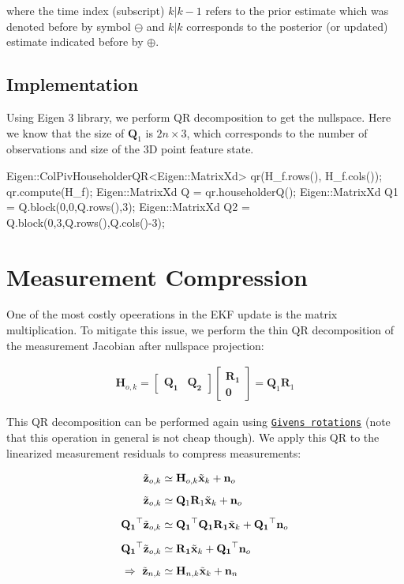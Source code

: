 where the time index (subscript) $k|k-1$ refers to the prior estimate which was denoted before by symbol $\ominus$ and $k|k$ corresponds to the posterior (or updated) estimate indicated before by $\oplus$.\hypertarget{update-null_implementation}{}\subsection{Implementation}\label{update-null_implementation}
Using Eigen 3 library, we perform QR decomposition to get the nullspace. Here we know that the size of $\mathbf{Q}_1$ is $2n\times3$, which corresponds to the number of observations and size of the 3D point feature state.


\begin{DoxyCode}
Eigen::ColPivHouseholderQR<Eigen::MatrixXd> qr(H\_f.rows(), H\_f.cols());
qr.compute(H\_f);
Eigen::MatrixXd Q = qr.householderQ();
Eigen::MatrixXd Q1 = Q.block(0,0,Q.rows(),3);
Eigen::MatrixXd Q2 = Q.block(0,3,Q.rows(),Q.cols()-3);
\end{DoxyCode}
 \hypertarget{update-compress}{}\section{Measurement Compression}\label{update-compress}
One of the most costly opeerations in the E\+KF update is the matrix multiplication. To mitigate this issue, we perform the thin QR decomposition of the measurement Jacobian after nullspace projection\+:

\begin{align*} \mathbf{H}_{o,k} = \begin{bmatrix} \mathbf{Q_1} & \mathbf{Q_2} \end{bmatrix} \begin{bmatrix} \mathbf{R_1} \\ \mathbf{0} \end{bmatrix} = \mathbf Q_1 \mathbf R_1 \end{align*}

This QR decomposition can be performed again using \href{https://en.wikipedia.org/wiki/Givens_rotation}{\tt Givens rotations} (note that this operation in general is not cheap though). We apply this QR to the linearized measurement residuals to compress measurements\+:

\begin{align*} \tilde{\mathbf{z}}_{o,k} &\simeq \mathbf{H}_{o,k}\tilde{\mathbf{x}}_{k} + \mathbf{n}_o \\[5px] \empty \tilde{\mathbf{z}}_{o,k} &\simeq \mathbf Q_1 \mathbf R_1 \tilde{\mathbf{x}}_{k} + \mathbf{n}_o \\[5px] \empty \mathbf{Q_1}^\top \tilde{\mathbf{z}}_{o,k} &\simeq \mathbf{Q_1}^\top \mathbf{Q_1} \mathbf{R_1} \tilde{\mathbf{x}}_{k} + \mathbf{Q_1}^\top \mathbf{n}_o \\[5px] \empty \mathbf{Q_1}^\top\tilde{\mathbf{z}}_{o,k} &\simeq \mathbf{R_1} \tilde{\mathbf{x}}_{k} + \mathbf{Q_1}^\top\mathbf{n}_o \\[5pt] \empty \Rightarrow~ \tilde{\mathbf{z}}_{n,k} &\simeq \mathbf{H}_{n,k} \tilde{\mathbf{x}}_{k} + \mathbf{n}_n \end{align*}

